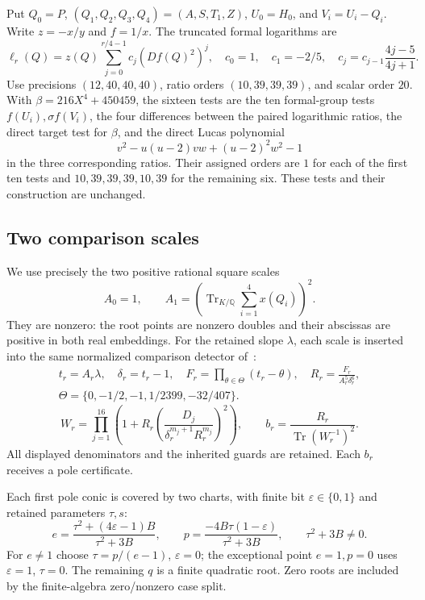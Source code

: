 \documentclass[11pt,a4paper]{article}
\newcommand{\Q}{\mathbb Q}\newcommand{\Z}{\mathbb Z}
\DeclareMathOperator{\Tr}{Tr}
\begin{document}
Put $Q_0=P$, $(Q_1,Q_2,Q_3,Q_4)=(A,S,T_1,Z)$,
$U_0=H_0$, and $V_i=U_i-Q_i$. Write $z=-x/y$ and $f=1/x$.
The truncated formal logarithms are
\[
 \ell_r(Q)=z(Q)\sum_{j=0}^{r/4-1}c_j(Df(Q)^2)^j,
 \quad c_0=1,\quad c_1=-2/5,\quad
 c_j=c_{j-1}\frac{4j-5}{4j+1}.
\]
Use precisions $(12,40,40,40)$, ratio orders $(10,39,39,39)$,
and scalar order $20$. With
$\beta=216X^4+450459$, the sixteen tests are the ten
formal-group tests $f(U_i),\sigma f(V_i)$, the four differences
between the paired logarithmic ratios, the direct target test
for $\beta$, and the direct Lucas polynomial
\[
 v^2-u(u-2)vw+(u-2)^2w^2-1
\]
in the three corresponding ratios. Their assigned orders are
$1$ for each of the first ten tests and
$10,39,39,39,10,39$ for the remaining six. These tests and
their construction are unchanged.

\subsection{Two comparison scales}

We use precisely the two positive rational
square scales
\begin{equation}\label{eq:scales}
 A_0=1,\qquad
 A_1=\left(\Tr_{K/\Q}\sum_{i=1}^4x(Q_i)\right)^2.
\end{equation}
They are nonzero: the root points are nonzero doubles and
their abscissas are positive in both real embeddings.
For the retained slope $\lambda$, each scale is inserted into
the same normalized comparison detector of~\cite{Baseline}:
\[
 \begin{gathered}
 t_r=A_r\lambda,\quad \delta_r=t_r-1,\quad
 F_r=\prod_{\theta\in\Theta}(t_r-\theta),\quad
 R_r=\frac{F_r}{A_r^5\delta_r^6},\\
 \Theta=\{0,-1/2,-1,1/2399,-32/407\}.
 \end{gathered}
\]
\[
 W_r=\prod_{j=1}^{16}\left(
 1+R_r\left(\frac{D_j}{\delta_r^{m_j+1}R_r^{m_j}}\right)^2\right),
 \qquad b_r=\frac{R_r}{\Tr(W_r^{-1})^2}.
\]
All displayed denominators and the inherited guards are retained.
Each $b_r$ receives a pole certificate.

Each first pole conic is covered by two charts, with finite bit
$\varepsilon\in\{0,1\}$ and retained parameters $\tau,s$:
\[
 e=\frac{\tau^2+(4\varepsilon-1)B}{\tau^2+3B},\qquad
 p=\frac{-4B\tau(1-\varepsilon)}{\tau^2+3B},\qquad
 \tau^2+3B\ne0.
\]
For $e\ne1$ choose $\tau=p/(e-1)$, $\varepsilon=0$;
the exceptional point $e=1,p=0$ uses $\varepsilon=1$, $\tau=0$.
The remaining $q$ is a finite quadratic root. Zero roots are
included by the finite-algebra zero/nonzero case split.
\end{document}
